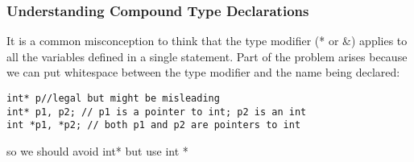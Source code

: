 \documentclass[11pt]{article}
\begin{document}
\subsubsection{Understanding Compound Type Declarations}
\label{sec-2-3-3}
It is a common misconception to think that the type modifier (* or \&) applies to all the variables defined in a single statement. Part of the problem arises because we can put whitespace between the type modifier and the name being declared:
\begin{verbatim}
int* p//legal but might be misleading
int* p1, p2; // p1 is a pointer to int; p2 is an int
int *p1, *p2; // both p1 and p2 are pointers to int
\end{verbatim}
so we should avoid int* but use int * 
\end{document}
